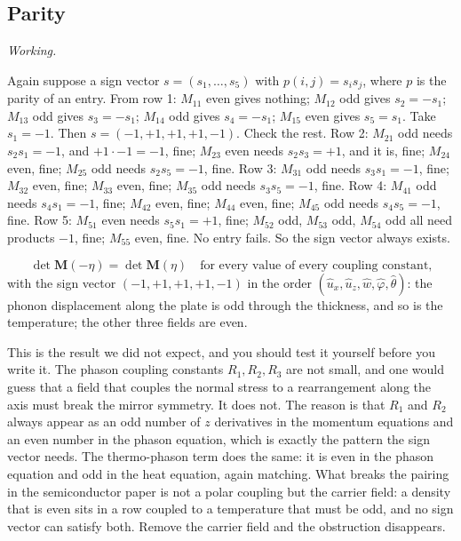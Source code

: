 \documentclass[11pt,a4paper]{article}
\newif\ifshowworked \showworkedtrue
\newenvironment{worked}{\ifshowworked\par\smallskip\noindent\textit{Working.}\par\else\setbox0\vbox\bgroup\fi}{\ifshowworked\par\smallskip\else\egroup\fi}
\newcommand{\bx}{\hat u_x}
\newcommand{\bz}{\hat u_z}
\newcommand{\bw}{\hat w}
\newcommand{\bp}{\hat\varphi}
\newcommand{\bt}{\hat\theta}
\begin{document}
\subsection{Parity}

\begin{worked}
Again suppose a sign vector $s=(s_1,\dots,s_5)$ with $p(i,j)=s_is_j$, where $p$ is the parity of an entry.
From row 1: $M_{11}$ even gives nothing; $M_{12}$ odd gives $s_2=-s_1$; $M_{13}$ odd gives $s_3=-s_1$;
$M_{14}$ odd gives $s_4=-s_1$; $M_{15}$ even gives $s_5=s_1$. Take $s_1=-1$. Then
$s=(-1,+1,+1,+1,-1)$. Check the rest. Row 2: $M_{21}$ odd needs $s_2s_1=-1$, and $+1\cdot-1=-1$, fine;
$M_{23}$ even needs $s_2s_3=+1$, and it is, fine; $M_{24}$ even, fine; $M_{25}$ odd needs $s_2s_5=-1$, fine.
Row 3: $M_{31}$ odd needs $s_3s_1=-1$, fine; $M_{32}$ even, fine; $M_{33}$ even, fine; $M_{35}$ odd needs
$s_3s_5=-1$, fine. Row 4: $M_{41}$ odd needs $s_4s_1=-1$, fine; $M_{42}$ even, fine; $M_{44}$ even, fine;
$M_{45}$ odd needs $s_4s_5=-1$, fine. Row 5: $M_{51}$ even needs $s_5s_1=+1$, fine; $M_{52}$ odd,
$M_{53}$ odd, $M_{54}$ odd all need products $-1$, fine; $M_{55}$ even, fine.
No entry fails. So the sign vector always exists.
\end{worked}

\noindent
\begin{equation}\label{eq:parity}
\det\mathbf M(-\eta)=\det\mathbf M(\eta)\quad\text{for every value of every coupling constant,}
\end{equation}
with the sign vector $(-1,+1,+1,+1,-1)$ in the order $(\bx,\bz,\bw,\bp,\bt)$: the phonon displacement along
the plate is odd through the thickness, and so is the temperature; the other three fields are even.

This is the result we did not expect, and you should test it yourself before you write it. The phason
coupling constants $R_1,R_2,R_3$ are not small, and one would guess that a field that couples the normal
stress to a rearrangement along the axis must break the mirror symmetry. It does not. The reason is that
$R_1$ and $R_2$ always appear as an odd number of $z$ derivatives in the momentum equations and an even
number in the phason equation, which is exactly the pattern the sign vector needs. The thermo-phason term
does the same: it is even in the phason equation and odd in the heat equation, again matching. What breaks
the pairing in the semiconductor paper is not a polar coupling but the carrier field: a density that is even
sits in a row coupled to a temperature that must be odd, and no sign vector can satisfy both. Remove the
carrier field and the obstruction disappears.
\end{document}
